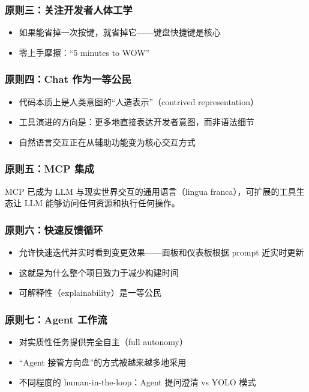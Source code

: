 \subsubsection{原则三：关注开发者人体工学}

\begin{itemize}
    \item 如果能省掉一次按键，就省掉它——键盘快捷键是核心
    \item 零上手摩擦：``5 minutes to WOW''
\end{itemize}

\subsubsection{原则四：Chat 作为一等公民}

\begin{itemize}
    \item 代码本质上是人类意图的``人造表示''（contrived representation）
    \item 工具演进的方向是：更多地直接表达开发者意图，而非语法细节
    \item 自然语言交互正在从辅助功能变为核心交互方式
\end{itemize}

\subsubsection{原则五：MCP 集成}

MCP 已成为 LLM 与现实世界交互的通用语言（lingua franca），可扩展的工具生态让 LLM 能够访问任何资源和执行任何操作。

\subsubsection{原则六：快速反馈循环}

\begin{itemize}
    \item 允许快速迭代并实时看到变更效果——面板和仪表板根据 prompt 近实时更新
    \item 这就是为什么整个项目致力于减少构建时间
    \item 可解释性（explainability）是一等公民
\end{itemize}

\subsubsection{原则七：Agent 工作流}

\begin{itemize}
    \item 对实质性任务提供完全自主（full autonomy）
    \item ``Agent 接管方向盘''的方式被越来越多地采用
    \item 不同程度的 human-in-the-loop：Agent 提问澄清 vs YOLO 模式
\end{itemize}

